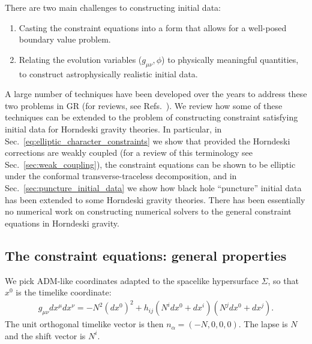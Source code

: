 \documentclass{ws-ijmpd}
\begin{document}
There are two main challenges to constructing initial data:
\begin{enumerate}
   \item Casting the constraint equations into a form that
      allows for a well-posed boundary value problem.
   
   \item Relating the evolution variables ($g_{\mu\nu},\phi$)
      to physically meaningful quantities, to construct
      astrophysically realistic initial data.
\end{enumerate}
A large number of techniques have been developed over the years to address
these two problems in GR (for reviews, see
Refs.~).
We review how some of these techniques can be extended to
the problem of constructing
constraint satisfying initial data for Horndeski gravity theories.
In particular,
in Sec.~\ref{eq:elliptic_character_constraints} we show that
provided the Horndeski corrections are weakly coupled 
(for a review of this terminology see Sec.~\ref{sec:weak_coupling}),
the constraint equations can be shown to be elliptic
under the conformal transverse-traceless decomposition, and
in Sec.~\ref{sec:puncture_initial_data} 
we show how black hole ``puncture'' initial data has been 
extended to some Horndeski gravity theories\cite{Kovacs:2021lgk}.
There has been essentially no numerical work on constructing numerical
solvers to the general constraint equations in Horndeski gravity.

\subsection{The constraint equations: general properties
\label{eq:constraint_equations_general_properties}
}
We pick ADM-like coordinates adapted to the spacelike hypersurface
$\Sigma$, so that $x^0$ is the timelike coordinate:
\begin{align}
   \label{eq:3p1_decomposition}
   g_{\mu\nu}dx^{\mu}dx^{\nu}
   =
   -
   N^2\left(dx^0\right)^2
   +
   h_{ij}\left(N^idx^0 + dx^i\right)\left(N^jdx^0 + dx^j\right)
   .
\end{align}
The unit orthogonal timelike vector is then $n_{\alpha}=\left(-N,0,0,0\right)$.
The lapse is $N$ and the shift vector is $N^i$.
\end{document}
